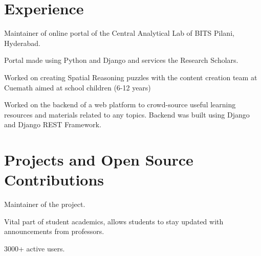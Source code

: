 \documentclass[]{abhijeet_viswa-deedy-resume-openfont}
\begin{document}
\hfill
\begin{minipage}[t]{0.70\textwidth}

\section{Experience}
\begin{tightemize}
\end{tightemize}
\subsectionsep

\begin{tightemize}
 \item Maintainer of online portal of the Central Analytical Lab of BITS Pilani, Hyderabad.
 \item Portal made using Python and Django and services the Research Scholars.
\end{tightemize}
\subsectionsep

\begin{tightemize}
\item Worked on creating Spatial Reasoning puzzles with the content creation team at Cuemath aimed at school children (6-12 years)
\item Worked on the backend of a web platform to crowd-source useful learning resources and materials related to any topics.
Backend was built using Django and Django REST Framework.
\end{tightemize}

\primarysectionsep  %

\section{Projects and Open Source Contributions}
\begin{tightemize}
\item Maintainer of the project.
\item Vital part of student academics, allows students to stay updated with announcements from professors.
\item 3000+ active users.
\end{tightemize}
\subsectionsep


\end{minipage}
\end{document}
